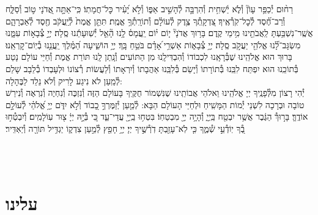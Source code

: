 \documentclass[twoside, openany, parskip=half, 11pt]{book}
\begin{document}
%
רַח֨וּם יְ֯כַפֵּ֥ר עָוֹן֘ וְ֯לֹ֢א יַ֫שְׁחִ֥ית וְ֯הִרְבָּ֣ה לְ֯הָשִׁ֣יב אַפּ֑וֹ וְ֯לֹ֣א יָ֝עִ֗יר כׇּל־חֲמָתֽוֹ׃ כִּֽי־אַתָּ֣ה
%
אֲ֭דֹנָי ט֣וֹב וְ֯סַלָּ֑ח וְ֯רַב־חֶ֝֗סֶד לְ֯כׇל־קֹֽרְ֯אֶֽיךָ׃ צִ֭דְקָֽתְ֯ךָ
%
צֶ֥דֶק לְ֯עוֹלָ֗ם וְ֯תוֹרָֽתְ֯ךָ֥ אֱמֶֽת׃ תִּתֵּ֤ן
%
אֱמֶת֙ לְ֯יַֽעֲקֹ֔ב חֶ֖סֶד לְ֯אַבְרָהָ֑ם אֲשֶֽׁר־נִשְׁבַּ֥עְתָּ לַֽאֲבֹתֵ֖ינוּ מִ֥ימֵי קֶֽדֶם׃ בָּר֥וּךְ
%
אֲדֹנָי֘ י֤וֹם י֗וֹם יַֽעֲמָס֫ לָ֥נוּ הָ֘אֵ֤ל יְ֯שֽׁוּעָתֵ֬נוּ סֶֽלָה׃ יְיָ֣
%
צְ֯בָא֣וֹת עִמָּ֑נוּ מִשְׂגָּב־לָ֝֗נוּ אֱלֹהֵ֖י יַעֲקֹ֣ב סֶֽלָה׃ יְיָ֥
%
צְ֯בָא֑וֹת אַשְׁרֵ֥י ֝אָדָ֗ם בֹּטֵ֥חַ בָּֽךְ׃ יְיָ֥
%
הוֹשִׁ֑יעָה הַ֝מֶּ֗לֶךְ יַֽעֲנֵ֥נוּ בְ֯יֽוֹם־קׇרְאֵֽנוּ׃ \\
בָּרוּךְ הוּא אֱלֹהֵֽינוּ שֶׁבְּ֯רָאָֽנוּ לִכְבוֹדוֹ וְ֯הִבְדִּילָֽנוּ מִן הַתּוֹעִים וְ֯נָֽתַן לָֽנוּ תּוֹרַת אֱמֶת וְ֯חַיֵּי עוֹלָם נָטַע בְּ֯תוֹכֵֽנוּ הוּא יִפְתַּח לִבֵּֽנוּ בְּ֯תוֹרָתוֹ וְ֯יָשֵׂם בְּ֯לִבֵּֽנוּ אַהֲבָתוֹ וְ֯יִרְאָתוֹ וְ֯לַעֲשׂוֹת רְ֯צוֹנוֹ וּלְעָבְדוֹ בְ֯לֵבָב שָׁלֵם לְ֯מַֽעַן לֹא נִיגַע לָרִיק וְ֯לֹא נֵלֵד לַבֶּהָלָה:\\
יְ֯הִי רָצוֹן מִלְּ֯פָנֶֽיךָ יְיָ אֱלֹהֵֽינוּ וֵאלֹהֵי אֲבוֹתֵֽינוּ שֶׁנִּשְׁמוֹר חֻקֶּֽיךָ בָּעוֹלָם הַזֶּה וְ֯נִזְכֶּה וְ֯נִחְיֶה וְ֯נִרְאֶה וְ֯נִירַשׁ טוֹבָה וּבְרָכָה לִשְׁנֵי יְ֯מוֹת הַמָּשִֽׁיחַ וּלְחַיֵּי הָעוֹלָם הַבָּא: לְ֯מַ֤עַן יְ֯זַמֶּרְךָ֣ כָ֭בוֹד וְ֯לֹ֣א יִדֹּ֑ם יְיָ֥ אֱ֝לֹהַ֗י לְ֯עוֹלָ֣ם אוֹדֶֽךָּ׃ בָּר֣וּךְ֯ הַגֶּ֔בֶר אֲשֶׁ֥ר יִבְטַ֖ח בַּֽיְיָ֑ וְ֯הָיָ֥ה יְיָ֖ מִבְטַחֽוֹ׃ בִּטְח֥וּ
%
בַֽיְיָ֖ עֲדֵי־עַ֑ד כִּ֚י בְּ֯יָ֣הּ יְיָ֔ צ֖וּר עֽוֹלָמִֽים׃  וְ֯יִבְטְ֯ח֣וּ
%
בְ֭֯ךָ יֽוֹדְ֯עֵ֣י שְׁ֯מֶ֑ךָ כִּ֤י לֹֽא־עָזַ֖בְתָּ דֹֽרְ֯שֶׁ֣יךָ יְיָ׃ יְיָ֥
%
חָפֵ֖ץ לְ֯מַ֣עַן צִדְק֑וֹ יַגְדִּ֥יל תּוֹרָ֖ה וְ֯יַאְדִּֽיר׃

\fullkaddish

\vfill

\\
\\

\clearpage
\section*{ עלינו }

\aleinu


\vfill


 \\
\end{document}
